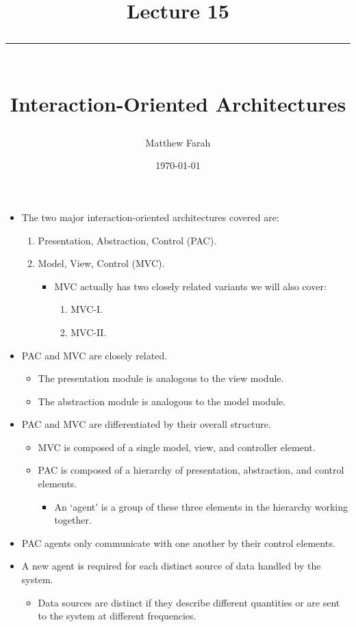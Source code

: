\documentclass{article}
\date{
	\vspace{-.75em}
	{\large \today}
}
\title{
	\vspace*{-1.5em}
	{\Huge Lecture 15} \\
	\vspace{-1em}
	\rule{\textwidth/4}{.01em} \\
	\vspace{-.25em}
	{\Large Interaction-Oriented Architectures}
	\vspace{-.75em}
}
\author{
	{\large Matthew Farah}
}
\begin{document}
\maketitle
\pagestyle{fancy}

\fi

\begin{itemize}
	\item The two major interaction-oriented architectures covered are:
	\begin{enumerate}
		\item Presentation, Abstraction, Control (PAC).
		\item Model, View, Control (MVC).
		\begin{itemize}
			\item MVC actually has two closely related variants we will also cover:
			\begin{enumerate}
				\item MVC-I.
				\item MVC-II.
			\end{enumerate}
		\end{itemize}
	\end{enumerate}
	\item PAC and MVC are closely related.
	\begin{itemize}
		\item The presentation module is analogous to the view module.
		\item The abstraction module is analogous to the model module.
	\end{itemize}
	\item PAC and MVC are differentiated by their overall structure.
	\begin{itemize}
		\item MVC is composed of a single model, view, and controller element.
		\item PAC is composed of a hierarchy of presentation, abstraction, and control elements.
		\begin{itemize}
			\item An `agent' is a group of these three elements in the hierarchy working together.
		\end{itemize}
	\end{itemize}
	\item PAC agents only communicate with one another by their control elements.
	\item A new agent is required for each distinct source of data handled by the system.
	\begin{itemize}
		\item Data sources are distinct if they describe different quantities or are sent to the system at different frequencies.

\end{itemize}
\end{itemize}
\end{document}
